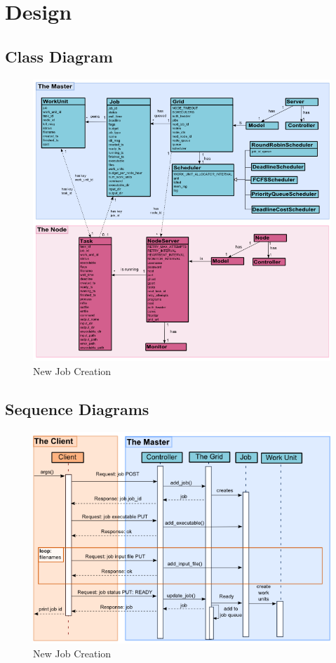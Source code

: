 \chapter{Design}

\section{Class Diagram}

\begin{figure}[htbp]
\centering
\includegraphics[keepaspectratio,width=\textwidth,height=0.75\textheight]{./figs/class.png}
\caption{New Job Creation}
\end{figure}

\section{Sequence Diagrams}

\begin{figure}[htbp]
\centering
\includegraphics[keepaspectratio,width=\textwidth,height=0.75\textheight]{./figs/jobcreate.png}
\caption{New Job Creation}
\end{figure}


